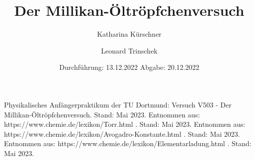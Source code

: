 

\subject{V503}
\title{Der Millikan-Öltröpfchenversuch}
\date{
  Durchführung: 13.12.2022
  \hspace{3em}
  Abgabe: 20.12.2022
}
\author{Katharina Kürschner \and Leonard Trinschek}



\maketitle
\thispagestyle{empty}
\tableofcontents
\newpage








\newpage

\begin{thebibliography}{9}
   Physikalisches Anfängerpraktikum der TU Dortmund: Versuch V503 -   Der Millikan-Öltröpfchenversuch. Stand: Mai 2023.
   Entnommen aus: https://www.chemie.de/lexikon/Torr.html . Stand: Mai 2023.
   Entnommen aus: https://www.chemie.de/lexikon/Avogadro-Konstante.html . Stand: Mai 2023.
   Entnommen aus: https://www.chemie.de/lexikon/Elementarladung.html . Stand: Mai 2023.
\end{thebibliography}


